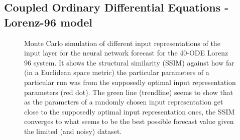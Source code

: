 \documentclass[journal]{IEEEtran}
\begin{document}
\subsection{Coupled Ordinary Differential Equations - Lorenz-96 model}

\begin{figure}[!htb]
\centering
{}
\caption{Monte Carlo simulation of different  input representations of the input layer for the neural network forecast for the 40-ODE Lorenz 96 system.
It shows the structural similarity (SSIM) against how far (in a Euclidean space metric) the particular parameters of a particular
run was from the supposedly optimal  input representation  parameters (red dot). The green line (trendline) seems to show that as the parameters
of a randomly chosen  input representation  get close to the supposedly optimal  input representation  ones, the SSIM converges to what seems to be the
best possible forecast value given the limited (and noisy) dataset.}
\label{MonteCarloSSIMversusParameterMetricDistanceLorenz96}
\end{figure}

\end{document}
